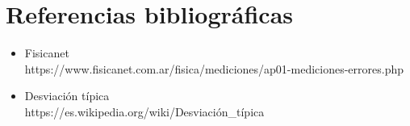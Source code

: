 \documentclass[letter,11pt]{article}
\begin{document}
\section{Referencias bibliográficas}
\begin{itemize}
\item Fisicanet \\
https://www.fisicanet.com.ar/fisica/mediciones/ap01-mediciones-errores.php
\item Desviación típica \\
https://es.wikipedia.org/wiki/Desviación\_típica
\end{itemize}
\end{document}
